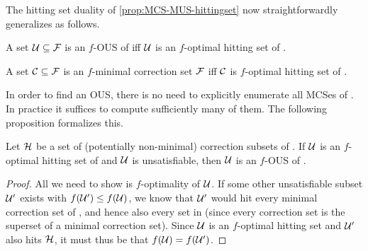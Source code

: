 The hitting set duality of \cref{prop:MCS-MUS-hittingset} now straightforwardly generalizes as follows. 

\begin{proposition}\label{prop:optimal-hitting-set}
  A set $\mathcal{U} \subseteq \mathcal{F} $ is an $f$-OUS of \formula iff $\mathcal{U}$ is an $f$-optimal hitting set of \mcses{\formula}.
  
  \noindent
   A set  $\mathcal{C} \subseteq \mathcal{F} $ is an $f$-minimal correction set $ \mathcal{F} $ iff  $\mathcal{C}$ is $f$-optimal hitting set of .
\end{proposition}

In order to find an OUS, there is no need to explicitly enumerate all MCSes of \formula. In practice it suffices to compute sufficiently many of them. 
The following proposition formalizes this. 
% 

\begin{proposition}\label{prop:K}
  Let $\mathcal{H}$ be a set of (potentially non-minimal) correction subsets of \formula. 
  If $\mathcal{U}$ is an $f$-optimal hitting set of  and $\mathcal{U}$ is unsatisfiable, then $\mathcal{U}$ is an $f$-OUS of \formula. 
\end{proposition}
\begin{proof}
  All we need to show is $f$-optimality of $\mathcal{U}$.
  If some other unsatisfiable subset $\mathcal{U}'$ exists with $f(\mathcal{U}')\leq f(\mathcal{U})$, we know that $\mathcal{U}'$ would hit every minimal correction set of , and hence also every set in  (since every correction set is the superset of a minimal correction set).
  Since $\mathcal{U}$ is an $f$-optimal hitting set and $\mathcal{U}'$ also hits $\mathcal{H}$, it must thus be that $f(\mathcal{U})=f(\mathcal{U'})$. 
%   
\end{proof}




